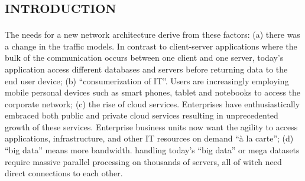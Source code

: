 %
\section*{\small \textsc{introduction}}
The needs for a new network architecture derive from these factors: (a) there was a change in the traffic models. In contrast to client-server applications where the bulk of the communication occurs between one client and one server, today's application access different databases and servers before returning data to the end user device; (b) ``consumerization of \ac{IT}''. Users are increasingly employing mobile personal devices such as smart phones, tablet and notebooks to access the corporate network; (c) the rise of cloud services. Enterprises have enthusiastically embraced both public and private cloud services resulting in unprecedented growth of these services. Enterprise business units now want the agility to access applications, infrastructure, and other \ac{IT} resources on demand ``à la carte''; (d) ``big data'' means more bandwidth. handling today's ``big data'' or mega datasets require massive parallel processing on thousands of servers, all of witch need direct connections to each other.

